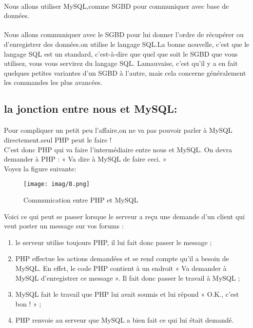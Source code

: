 \paragraph{}
Nous allons utiliser MySQL,comme SGBD pour communiquer avec base de données.
\paragraph{}
Nous allons communiquer avec le SGBD pour lui donner l'ordre de récupérer ou d'enregistrer des données.on utilise le langage SQL.La bonne nouvelle, c'est que le langage SQL est un standard, c'est-à-dire que quel que soit le SGBD que vous utilisez, vous vous servirez du langage SQL. Lamauvaise, c'est qu'il y a en fait quelques petites variantes d'un SGBD à l'autre, mais cela concerne généralement les commandes les plus avancées.
\subsection{la jonction entre nous et MySQL:}
\paragraph{}
Pour compliquer un petit peu l'affaire,on ne va pas pouvoir parler à MySQL directement.seul PHP peut le faire !\\
C'est donc PHP qui va faire l'intermédiaire entre nous et MySQL. On devra demander à PHP : « Va dire à MySQL de faire ceci. »\\

Voyez la figure suivante:
\begin{figure}[h]
	\texttt{[image: imag/8.png]}
	\caption{Communication entre PHP et MySQL}
\end{figure}
Voici ce qui peut se passer lorsque le serveur a reçu une demande d'un client qui veut poster un message sur vos forums :
\begin{enumerate}
	\item le serveur utilise toujours PHP, il lui fait donc passer le message ;
	\item PHP effectue les actions demandées et se rend compte qu'il a besoin de MySQL. En effet, le code PHP contient à un endroit « Va demander à MySQL d'enregistrer ce message ». Il fait donc passer le travail à MySQL ;
	\item MySQL fait le travail que PHP lui avait soumis et lui répond « O.K., c'est bon ! » ;
	\item PHP renvoie au serveur que MySQL a bien fait ce qui lui était demandé.
\end{enumerate}
